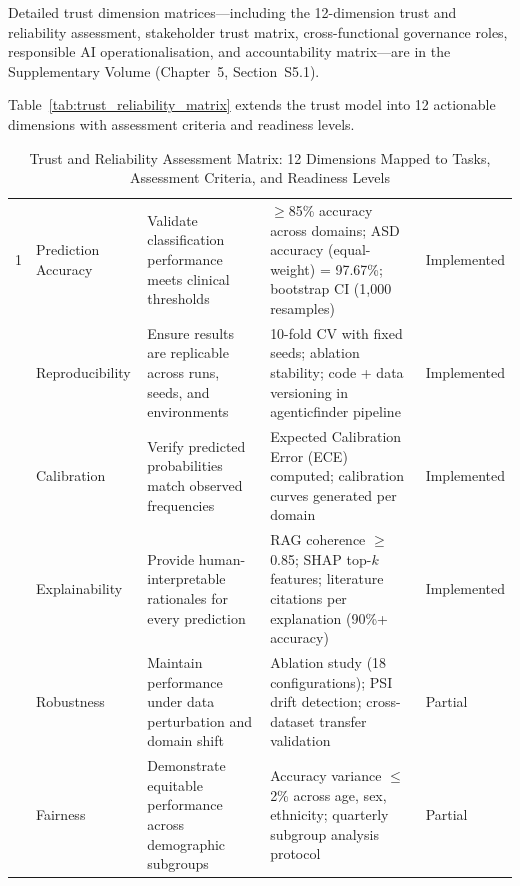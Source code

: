 Detailed trust dimension matrices---including the 12-dimension trust and reliability assessment, stakeholder trust matrix, cross-functional governance roles, responsible AI operationalisation, and accountability matrix---are in the Supplementary Volume (Chapter~5, Section~S5.1).

\iffalse
Table~\ref{tab:trust_reliability_matrix} extends the trust model into 12 actionable dimensions with assessment criteria and readiness levels.

\begin{table}[!htbp]
\tablestripes
\tablefontsize
\caption[Trust and Reliability Assessment Matrix]{Trust and Reliability Assessment Matrix: 12 Dimensions Mapped to Tasks, Assessment Criteria, and Readiness Levels}
%
\begin{tabularx}{\textwidth}{@{} p{0.4cm} >{\raggedright\arraybackslash}p{1.6cm} L L >{\raggedright\arraybackslash}p{1.6cm} @{}}
\toprule
\thead{\#} &  &  &  &  \\
 & Prediction Accuracy & Validate classification performance meets clinical thresholds & $\geq$85\% accuracy across domains; ASD accuracy (equal-weight) = 97.67\%; bootstrap CI (1{,}000 resamples) & Implemented \\
 & Reproducibility & Ensure results are replicable across runs, seeds, and environments & 10-fold CV with fixed seeds; ablation stability; code + data versioning in agenticfinder pipeline & Implemented \\
 & Calibration & Verify predicted probabilities match observed frequencies & Expected Calibration Error (ECE) computed; calibration curves generated per domain & Implemented \\
 & Explainability & Provide human-interpretable rationales for every prediction & RAG coherence $\geq$0.85; SHAP top-$k$ features; literature citations per explanation (90\%+ accuracy) & Implemented \\
 & Robustness & Maintain performance under data perturbation and domain shift & Ablation study (18 configurations); PSI drift detection; cross-dataset transfer validation & Partial \\
 & Fairness & Demonstrate equitable performance across demographic subgroups & Accuracy variance $\leq$2\% across age, sex, ethnicity; quarterly subgroup analysis protocol & Partial \\

\end{tabularx}
\end{table}
